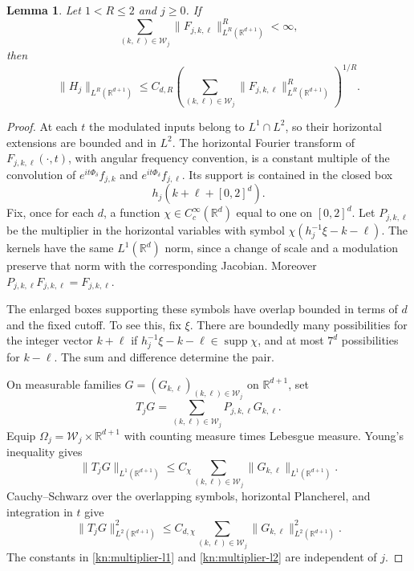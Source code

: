 \documentclass[11pt]{article}
\numberwithin{equation}{section}
\newtheorem{lemma}[theorem]{Lemma}
\newcommand{\R}{\mathbb{R}}
\newcommand{\norm}[1]{\lVert #1\rVert}
\begin{document}
\begin{lemma}\label{kn:layer}
Let \(1<R\le2\) and \(j\ge0\). If
\[
 \sum_{(k,\ell)\in\mathcal W_j}
   \norm{F_{j,k,\ell}}_{L^R(\R^{d+1})}^{R}<\infty,
\]
then
\[
 \norm{H_j}_{L^R(\R^{d+1})}
 \le C_{d,R}\left(
   \sum_{(k,\ell)\in\mathcal W_j}
       \norm{F_{j,k,\ell}}_{L^R(\R^{d+1})}^{R}
             \right)^{1/R}.
\]
\end{lemma}

\begin{proof}
At each \(t\) the modulated inputs belong to \(L^1\cap L^2\), so their
horizontal extensions are bounded and in \(L^2\). The horizontal Fourier transform of
\(F_{j,k,\ell}(\cdot,t)\), with angular frequency convention, is a
constant multiple of the convolution of
\(e^{it\Phi_\delta}f_{j,k}\) and \(e^{it\Phi_\delta}f_{j,\ell}\). Its
support is contained in the closed box
\[
 h_j(k+\ell+[0,2]^d).
\]
Fix, once for each \(d\), a function
\(\chi\in C_c^\infty(\R^d)\) equal to one on \([0,2]^d\). Let
\(P_{j,k,\ell}\) be the multiplier in the horizontal variables with
symbol \(\chi(h_j^{-1}\xi-k-\ell)\). The kernels have the same
\(L^1(\R^d)\) norm, since a change of scale and a modulation preserve
that norm with the corresponding Jacobian. Moreover
\(P_{j,k,\ell}F_{j,k,\ell}=F_{j,k,\ell}\).

The enlarged boxes supporting these symbols have overlap bounded in
terms of \(d\) and the fixed cutoff. To see this, fix \(\xi\). There
are boundedly many possibilities for the integer vector \(k+\ell\)
if \(h_j^{-1}\xi-k-\ell\in\operatorname{supp}\chi\), and at most
\(7^d\) possibilities for \(k-\ell\). The sum and difference determine
the pair.

On measurable families \(G=(G_{k,\ell})_{(k,\ell)\in\mathcal W_j}\)
on \(\R^{d+1}\), set
\[
 T_jG=\sum_{(k,\ell)\in\mathcal W_j}P_{j,k,\ell}G_{k,\ell}.
\]
Equip \(\Omega_j=\mathcal W_j\times\R^{d+1}\) with counting measure
times Lebesgue measure. Young's inequality gives
\begin{equation}\label{kn:multiplier-l1}
 \norm{T_jG}_{L^1(\R^{d+1})}
 \le C_\chi
     \sum_{(k,\ell)\in\mathcal W_j}
        \norm{G_{k,\ell}}_{L^1(\R^{d+1})}.
\end{equation}
Cauchy--Schwarz over the overlapping symbols, horizontal Plancherel,
and integration in \(t\) give
\begin{equation}\label{kn:multiplier-l2}
 \norm{T_jG}_{L^2(\R^{d+1})}^2
 \le C_{d,\chi}
     \sum_{(k,\ell)\in\mathcal W_j}
        \norm{G_{k,\ell}}_{L^2(\R^{d+1})}^2.
\end{equation}
The constants in \eqref{kn:multiplier-l1} and
\eqref{kn:multiplier-l2} are independent of \(j\).


\end{proof}
\end{document}
